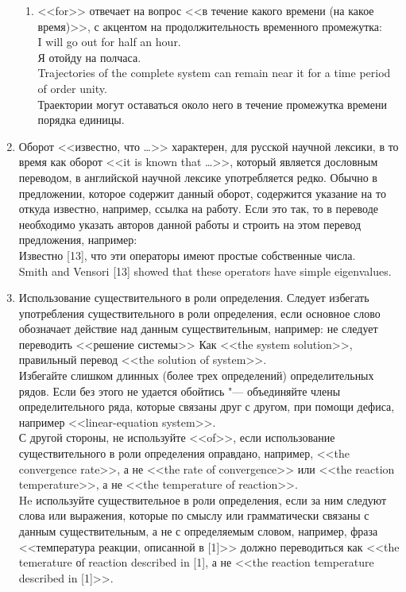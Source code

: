 \documentclass[a5paper, 10pt, twoside, numbers=enddot]{scrartcl}
\begin{document}
\begin{enumerate}
\begin{enumerate}
    \item <<for>> отвечает на вопрос <<в течение какого времени (на какое время)>>, с акцентом на продолжительность временного промежутка:\\ [4pt]
    \textsf{I will go out for half an hour.\\
    Я отойду на полчаса.\\ [4pt]
    Trajectories of the complete system can remain near it for a time period of order unity.\\
    Траектории могут оставаться около него в течение промежутка времени порядка единицы.}
  \end{enumerate}

  \item Оборот <<известно, что \ldots>> характерен, для русской научной лексики, в то  время как оборот <<it is known that \ldots>>, который является дословным переводом, в английской научной лексике употребляется редко. Обычно в предложении, которое содержит данный оборот, содержится указание на то откуда известно, например, ссылка на работу. Если это так, то в переводе необходимо указать авторов данной работы и строить на этом перевод предложения, например: \\ [4pt]
  \textsf{Известно [13], что эти операторы имеют простые собственные числа.\\
  Smith and Vensori [13] showed that these operators have simple eigenvalues.}

  \item Использование существительного в роли определения. Следует избегать  употребления существительного в роли определения, если основное слово  обозначает действие над данным существительным, например: не следует  переводить <<решение системы>> Как <<the system solution>>, правильный перевод <<the solution of system>>.\\ [4pt]
  Избегайте слишком длинных (более трех определений) определительных рядов. Если без этого не удается обойтись "--- объединяйте члены определительного ряда, которые связаны друг с другом, при помощи дефиса, например <<linear-equation system>>.\\ [4pt]
  С другой стороны, не используйте <<of>>,  если использование существительного в роли определения оправдано, например, <<the convergence rate>>, а не <<the rate of convergence>> или <<the reaction temperature>>, а не <<the temperature of reaction>>.\\ [4pt]
  He используйте существительное в роли определения, если за ним следуют слова или выражения, которые по смыслу или грамматически связаны с данным существительным, а не с определяемым словом, например, фраза <<температура реакции, описанной в [1]>> должно переводиться как <<the temerature оf reaction described in [1], а не <<the reaction temperature described in [1]>>.


\end{enumerate}
\end{document}
